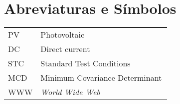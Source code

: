 \chapter*{Abreviaturas e Símbolos}

\begin{flushleft}
\begin{tabular}{l p{0.8\linewidth}}
PV      & Photovoltaic\\
DC      & Direct current\\
STC      & Standard Test Conditions\\
MCD      & Minimum Covariance Determinant\\
WWW      & \emph{World Wide Web}
\end{tabular}
\end{flushleft}

